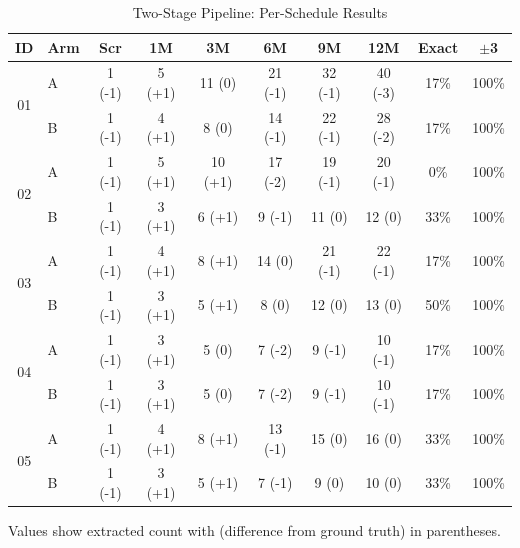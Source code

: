 
\begin{table}[htbp]
\centering
\caption{Two-Stage Pipeline: Per-Schedule Results}
\label{tab:two_stage_detailed}
\small
\begin{tabular}{clcccccccc}
\toprule
\textbf{ID} & \textbf{Arm} & \textbf{Scr} & \textbf{1M} & \textbf{3M} & \textbf{6M} & \textbf{9M} & \textbf{12M} & \textbf{Exact} & \textbf{$\pm$3} \\
\midrule
\multirow{2}{*}{01} & A & 1 (-1) & 5 (+1) & 11 (0) & 21 (-1) & 32 (-1) & 40 (-3) & 17\% & 100\% \\
 & B & 1 (-1) & 4 (+1) & 8 (0) & 14 (-1) & 22 (-1) & 28 (-2) & 17\% & 100\% \\
\midrule
\multirow{2}{*}{02} & A & 1 (-1) & 5 (+1) & 10 (+1) & 17 (-2) & 19 (-1) & 20 (-1) & 0\% & 100\% \\
 & B & 1 (-1) & 3 (+1) & 6 (+1) & 9 (-1) & 11 (0) & 12 (0) & 33\% & 100\% \\
\midrule
\multirow{2}{*}{03} & A & 1 (-1) & 4 (+1) & 8 (+1) & 14 (0) & 21 (-1) & 22 (-1) & 17\% & 100\% \\
 & B & 1 (-1) & 3 (+1) & 5 (+1) & 8 (0) & 12 (0) & 13 (0) & 50\% & 100\% \\
\midrule
\multirow{2}{*}{04} & A & 1 (-1) & 3 (+1) & 5 (0) & 7 (-2) & 9 (-1) & 10 (-1) & 17\% & 100\% \\
 & B & 1 (-1) & 3 (+1) & 5 (0) & 7 (-2) & 9 (-1) & 10 (-1) & 17\% & 100\% \\
\midrule
\multirow{2}{*}{05} & A & 1 (-1) & 4 (+1) & 8 (+1) & 13 (-1) & 15 (0) & 16 (0) & 33\% & 100\% \\
 & B & 1 (-1) & 3 (+1) & 5 (+1) & 7 (-1) & 9 (0) & 10 (0) & 33\% & 100\% \\
\bottomrule
\end{tabular}
\begin{tablenotes}
\small
\item Values show extracted count with (difference from ground truth) in parentheses.
\end{tablenotes}
\end{table}


